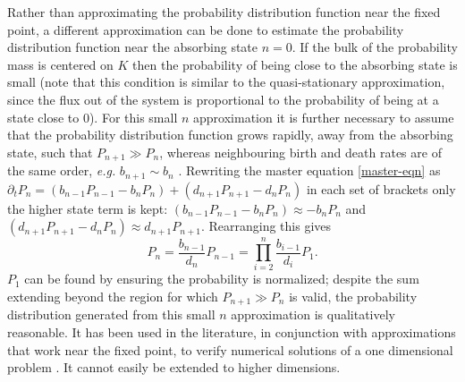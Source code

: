 Rather than approximating the probability distribution function near the fixed point, a different approximation can be done to estimate the probability distribution function near the absorbing state $n=0$. %
If the bulk of the probability mass is centered on $K$ then the probability of being close to the absorbing state is small (note that this condition is similar to the quasi-stationary approximation, since the flux out of the system is proportional to the probability of being at a state close to $0$). 
For this small $n$ approximation it is further necessary to assume that the probability distribution function grows rapidly, away from the absorbing state, such that $P_{n+1}\gg P_n$, whereas neighbouring birth and death rates are of the same order, \emph{e.g.} $b_{n+1}\sim b_n$ \cite{Gardiner2004a,Assaf2010}. 
Rewriting the master equation \ref{master-eqn} as $\partial_t P_n = \left(b_{n-1} P_{n-1} - b_n P_n \right) + \left(d_{n+1}P_{n+1} - d_n P_n\right)$ in each set of brackets only the higher state term is kept: $\left(b_{n-1} P_{n-1} - b_n P_n \right) \approx - b_n P_n$ and $\left(d_{n+1}P_{n+1} - d_n P_n\right) \approx d_{n+1}P_{n+1}$. 
Rearranging this gives \cite{Gardiner2004a}
\begin{equation}
P_n = \frac{b_{n-1}}{d_n}P_{n-1} = \prod_{i=2}^n \frac{b_{i-1}}{d_i} P_{1}. 
\end{equation}
$P_{1}$ can be found by ensuring the probability is normalized; despite the sum extending beyond the region for which $P_{n+1}\gg P_n$ is valid, the probability distribution generated from this small $n$ approximation is qualitatively reasonable. 
It has been used in the literature, in conjunction with approximations that work near the fixed point, to verify numerical solutions of a one dimensional problem \cite{Assaf2010}. 
It cannot easily be extended to higher dimensions. 


